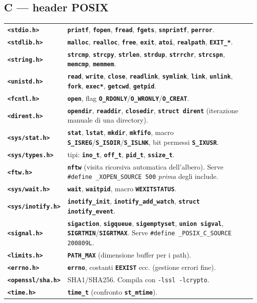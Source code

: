 \documentclass[10pt,a4paper]{article}
\newcommand{\fn}[1]{\texttt{\textbf{#1}}}
\begin{document}
\subsection{C --- header POSIX}
\begin{tabular}{@{}p{4.2cm}p{12.5cm}@{}}
\fn{<stdio.h>} & \fn{printf}, \fn{fopen}, \fn{fread}, \fn{fgets}, \fn{snprintf}, \fn{perror}. \\
\fn{<stdlib.h>} & \fn{malloc}, \fn{realloc}, \fn{free}, \fn{exit}, \fn{atoi}, \fn{realpath}, \fn{EXIT\_*}. \\
\fn{<string.h>} & \fn{strcmp}, \fn{strcpy}, \fn{strlen}, \fn{strdup}, \fn{strrchr}, \fn{strcspn}, \fn{memcmp}, \fn{memmem}. \\
\fn{<unistd.h>} & \fn{read}, \fn{write}, \fn{close}, \fn{readlink}, \fn{symlink}, \fn{link}, \fn{unlink}, \fn{fork}, \fn{exec*}, \fn{getcwd}, \fn{getpid}. \\
\fn{<fcntl.h>} & \fn{open}, flag \fn{O\_RDONLY}/\fn{O\_WRONLY}/\fn{O\_CREAT}. \\
\fn{<dirent.h>} & \fn{opendir}, \fn{readdir}, \fn{closedir}, \fn{struct dirent} (iterazione manuale di una directory). \\
\fn{<sys/stat.h>} & \fn{stat}, \fn{lstat}, \fn{mkdir}, \fn{mkfifo}, macro \fn{S\_ISREG}/\fn{S\_ISDIR}/\fn{S\_ISLNK}, bit permessi \fn{S\_IXUSR}. \\
\fn{<sys/types.h>} & tipi: \fn{ino\_t}, \fn{off\_t}, \fn{pid\_t}, \fn{ssize\_t}. \\
\fn{<ftw.h>} & \fn{nftw} (visita ricorsiva automatica dell'albero). Serve \verb|#define _XOPEN_SOURCE 500| \emph{prima} degli include. \\
\fn{<sys/wait.h>} & \fn{wait}, \fn{waitpid}, macro \fn{WEXITSTATUS}. \\
\fn{<sys/inotify.h>} & \fn{inotify\_init}, \fn{inotify\_add\_watch}, \fn{struct inotify\_event}. \\
\fn{<signal.h>} & \fn{sigaction}, \fn{sigqueue}, \fn{sigemptyset}, \fn{union sigval}, \fn{SIGRTMIN}/\fn{SIGRTMAX}. Serve \verb|#define _POSIX_C_SOURCE 200809L|. \\
\fn{<limits.h>} & \fn{PATH\_MAX} (dimensione buffer per i path). \\
\fn{<errno.h>} & \fn{errno}, costanti \fn{EEXIST} ecc. (gestione errori fine). \\
\fn{<openssl/sha.h>} & SHA1/SHA256. Compila con \verb|-lssl -lcrypto|. \\
\fn{<time.h>} & \fn{time\_t} (confronto \fn{st\_mtime}). \\
\end{tabular}
\end{document}
